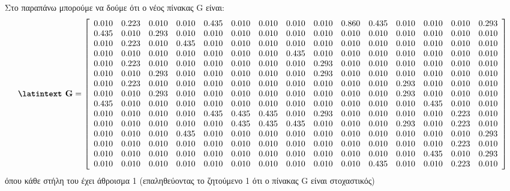 \documentclass[a4paper,11pt]{article}
\newcommand{\lt}{\latintext}
\begin{document}
Στο παραπάνω μπορούμε να δούμε ότι ο νέος πίνακας {\lt G} είναι:\\
\[\textbf{{\lt G}}=
    \left[ \begin{array}{ccccccccccccccc}
    0.010 & 0.223 & 0.010 & 0.010 & 0.435 & 0.010 & 0.010 & 0.010 & 0.010 & 0.860 & 0.435 & 0.010 & 0.010 & 0.010 & 0.293 \\
    0.435 & 0.010 & 0.293 & 0.010 & 0.010 & 0.010 & 0.010 & 0.010 & 0.010 & 0.010 & 0.010 & 0.010 & 0.010 & 0.010 & 0.010 \\
    0.010 & 0.223 & 0.010 & 0.435 & 0.010 & 0.010 & 0.010 & 0.010 & 0.010 & 0.010 & 0.010 & 0.010 & 0.010 & 0.010 & 0.010 \\
    0.010 & 0.010 & 0.010 & 0.010 & 0.010 & 0.010 & 0.010 & 0.435 & 0.010 & 0.010 & 0.010 & 0.010 & 0.010 & 0.010 & 0.010 \\
    0.010 & 0.223 & 0.010 & 0.010 & 0.010 & 0.010 & 0.010 & 0.010 & 0.293 & 0.010 & 0.010 & 0.010 & 0.010 & 0.010 & 0.010 \\
    0.010 & 0.010 & 0.293 & 0.010 & 0.010 & 0.010 & 0.010 & 0.010 & 0.293 & 0.010 & 0.010 & 0.010 & 0.010 & 0.010 & 0.010 \\
    0.010 & 0.223 & 0.010 & 0.010 & 0.010 & 0.010 & 0.010 & 0.010 & 0.010 & 0.010 & 0.010 & 0.293 & 0.010 & 0.010 & 0.010 \\
    0.010 & 0.010 & 0.293 & 0.010 & 0.010 & 0.010 & 0.010 & 0.010 & 0.010 & 0.010 & 0.010 & 0.293 & 0.010 & 0.010 & 0.010 \\
    0.435 & 0.010 & 0.010 & 0.010 & 0.010 & 0.010 & 0.010 & 0.010 & 0.010 & 0.010 & 0.010 & 0.010 & 0.435 & 0.010 & 0.010 \\
    0.010 & 0.010 & 0.010 & 0.010 & 0.435 & 0.435 & 0.435 & 0.010 & 0.293 & 0.010 & 0.010 & 0.010 & 0.010 & 0.223 & 0.010 \\
    0.010 & 0.010 & 0.010 & 0.010 & 0.010 & 0.435 & 0.435 & 0.435 & 0.010 & 0.010 & 0.010 & 0.293 & 0.010 & 0.223 & 0.010 \\
    0.010 & 0.010 & 0.010 & 0.435 & 0.010 & 0.010 & 0.010 & 0.010 & 0.010 & 0.010 & 0.010 & 0.010 & 0.010 & 0.010 & 0.293 \\
    0.010 & 0.010 & 0.010 & 0.010 & 0.010 & 0.010 & 0.010 & 0.010 & 0.010 & 0.010 & 0.010 & 0.010 & 0.010 & 0.223 & 0.010 \\
    0.010 & 0.010 & 0.010 & 0.010 & 0.010 & 0.010 & 0.010 & 0.010 & 0.010 & 0.010 & 0.010 & 0.010 & 0.435 & 0.010 & 0.293 \\
    0.010 & 0.010 & 0.010 & 0.010 & 0.010 & 0.010 & 0.010 & 0.010 & 0.010 & 0.010 & 0.435 & 0.010 & 0.010 & 0.223 & 0.010 \\
    \end{array} \right]
\]
όπου κάθε στήλη του έχει άθροισμα 1 (επαληθεύοντας το ζητούμενο 1 ότι ο πίνακας {\lt G} είναι στοχαστικός)\\
\end{document}
